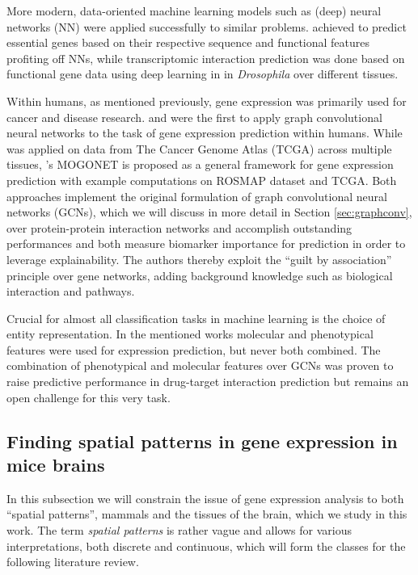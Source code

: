 \documentclass[]{article}
\renewcommand{\cite}{\citep}
\begin{document}
More modern, data-oriented machine learning models such as (deep) neural networks (NN) were applied successfully to similar problems. \citet{aromolaran2020essential} achieved to predict essential genes based on their respective sequence and functional features profiting off NNs, while transcriptomic interaction prediction was done based on functional gene data using deep learning in \citet{yang2019predicting} in \textit{Drosophila} over different tissues. 

Within humans, as mentioned previously, gene expression was primarily used for cancer and disease research. \citet{schulte2021integration} and \citet{wang2021mogonet} were the first to apply graph convolutional neural networks to the task of gene expression prediction within humans. While \citet{schulte2021integration} was applied on data from The Cancer Genome Atlas (TCGA)\cite{tomczak2015review} across multiple tissues, \citet{wang2021mogonet}'s MOGONET is proposed as a general framework for gene expression prediction with example computations on ROSMAP dataset and TCGA. Both approaches implement the original formulation of graph convolutional neural networks (GCNs)\cite{GCNConv}, which we will discuss in more detail in Section \ref{sec:graphconv}, over protein-protein interaction networks and accomplish outstanding performances and both measure biomarker importance for prediction in order to leverage explainability. The authors thereby exploit the ``guilt by association'' principle \cite{Oliver2000, Gillis2012} over gene networks, adding background knowledge such as biological interaction and pathways.

Crucial for almost all classification tasks in machine learning is the choice of entity representation. In the mentioned works molecular \cite{schulte2021integration, modencode2010identification, noble2006support} and phenotypical \cite{wang2021mogonet, chikina2009global} features were used for expression prediction, but never both combined. The combination of phenotypical and molecular features over GCNs was proven to raise predictive performance in drug-target interaction prediction \cite{hinnerichs2021dti} but remains an open challenge for this very task.


\subsection{Finding spatial patterns in gene expression in mice brains}
\label{sec:relatedwork_micebrains}
In this subsection we will constrain the issue of gene expression analysis to both ``spatial patterns'', mammals and the tissues of the brain, which we study in this work. The term \textit{spatial patterns} is rather vague and allows for various interpretations, both discrete and continuous, which will form the classes for the following literature review.\\
\end{document}

